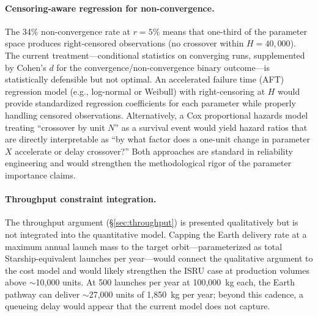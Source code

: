 \documentclass[preprint,12pt]{elsarticle}
\begin{document}
\paragraph{Censoring-aware regression for non-convergence.} The 34\% non-convergence rate at $r = 5\%$ means that one-third of the parameter space produces right-censored observations (no crossover within $H = 40{,}000$). The current treatment---conditional statistics on converging runs, supplemented by Cohen's $d$ for the convergence/non-convergence binary outcome---is statistically defensible but not optimal. An accelerated failure time (AFT) regression model (e.g., log-normal or Weibull) with right-censoring at $H$ would provide standardized regression coefficients for each parameter while properly handling censored observations. Alternatively, a Cox proportional hazards model treating ``crossover by unit $N$'' as a survival event would yield hazard ratios that are directly interpretable as ``by what factor does a one-unit change in parameter $X$ accelerate or delay crossover?'' Both approaches are standard in reliability engineering and would strengthen the methodological rigor of the parameter importance claims.

\paragraph{Throughput constraint integration.} The throughput argument (\S\ref{sec:throughput}) is presented qualitatively but is not integrated into the quantitative model. Capping the Earth delivery rate at a maximum annual launch mass to the target orbit---parameterized as total Starship-equivalent launches per year---would connect the qualitative argument to the cost model and would likely strengthen the ISRU case at production volumes above $\sim$10{,}000 units. At 500 launches per year at 100{,}000~kg each, the Earth pathway can deliver $\sim$27{,}000 units of 1{,}850~kg per year; beyond this cadence, a queueing delay would appear that the current model does not capture.
\end{document}
